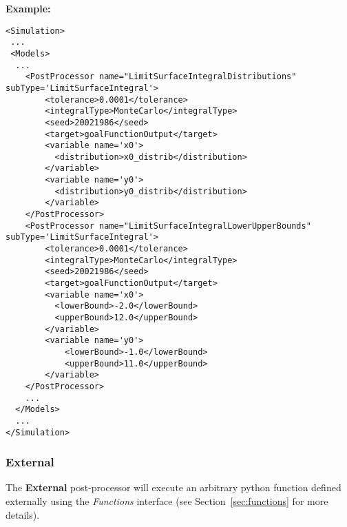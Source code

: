 \textbf{Example:}
\begin{lstlisting}[style=XML,morekeywords={name,subType,debug,class,type}]
<Simulation>
 ...
 <Models>
  ...
    <PostProcessor name="LimitSurfaceIntegralDistributions" subType='LimitSurfaceIntegral'>
        <tolerance>0.0001</tolerance>
        <integralType>MonteCarlo</integralType>
        <seed>20021986</seed>
        <target>goalFunctionOutput</target>
        <variable name='x0'>
          <distribution>x0_distrib</distribution>
        </variable>
        <variable name='y0'>
          <distribution>y0_distrib</distribution>
        </variable>
    </PostProcessor>
    <PostProcessor name="LimitSurfaceIntegralLowerUpperBounds" subType='LimitSurfaceIntegral'>
        <tolerance>0.0001</tolerance>
        <integralType>MonteCarlo</integralType>
        <seed>20021986</seed>
        <target>goalFunctionOutput</target>
        <variable name='x0'>
          <lowerBound>-2.0</lowerBound>
          <upperBound>12.0</upperBound>
        </variable>
        <variable name='y0'>
            <lowerBound>-1.0</lowerBound>
            <upperBound>11.0</upperBound>
        </variable>
    </PostProcessor>
    ...
  </Models>
  ...
</Simulation>
\end{lstlisting}



\subsubsection{External}
\label{External}
The \textbf{External} post-processor will execute an arbitrary python function
defined externally using the \textit{Functions} interface (see
Section~\ref{sec:functions} for more details).
%


